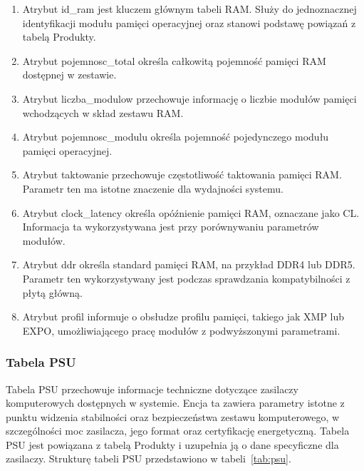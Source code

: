 \documentclass[a4paper,twoside,12pt]{book}
\begin{document}
\begin{enumerate}
    \item Atrybut id\_ram jest kluczem głównym tabeli RAM. Służy do jednoznacznej
    identyfikacji modułu pamięci operacyjnej oraz stanowi podstawę powiązań z
    tabelą Produkty.

    \item Atrybut pojemnosc\_total określa całkowitą pojemność pamięci RAM
    dostępnej w zestawie.

    \item Atrybut liczba\_modulow przechowuje informację o liczbie modułów pamięci
    wchodzących w skład zestawu RAM.

    \item Atrybut pojemnosc\_modulu określa pojemność pojedynczego modułu pamięci
    operacyjnej.

    \item Atrybut taktowanie przechowuje częstotliwość taktowania pamięci RAM.
    Parametr ten ma istotne znaczenie dla wydajności systemu.

    \item Atrybut clock\_latency określa opóźnienie pamięci RAM, oznaczane jako CL.
    Informacja ta wykorzystywana jest przy porównywaniu parametrów modułów.

    \item Atrybut ddr określa standard pamięci RAM, na przykład DDR4 lub DDR5.
    Parametr ten wykorzystywany jest podczas sprawdzania kompatybilności z płytą
    główną.

    \item Atrybut profil informuje o obsłudze profilu pamięci, takiego jak XMP lub
    EXPO, umożliwiającego pracę modułów z podwyższonymi parametrami.
\end{enumerate}
\newpage 
\subsubsection{Tabela PSU}
Tabela PSU przechowuje informacje techniczne dotyczące zasilaczy komputerowych
dostępnych w systemie. Encja ta zawiera parametry istotne z punktu widzenia
stabilności oraz bezpieczeństwa zestawu komputerowego, w szczególności moc
zasilacza, jego format oraz certyfikację energetyczną. Tabela PSU jest powiązana
z tabelą Produkty i uzupełnia ją o dane specyficzne dla zasilaczy. Strukturę
tabeli PSU przedstawiono w tabeli~\ref{tab:psu}.
\end{document}
